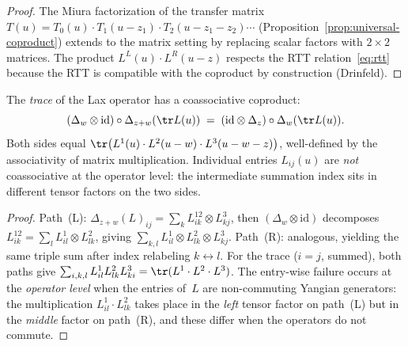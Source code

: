 \begin{proof}
The Miura factorization of the transfer matrix
$T(u) = T_0(u) \cdot T_1(u - z_1) \cdot T_2(u - z_1 - z_2) \cdots$
(Proposition~\ref{prop:universal-coproduct}) extends to the matrix
setting by replacing scalar factors with $2 \times 2$ matrices.
The product $L^L(u) \cdot L^R(u-z)$ respects the RTT
relation~\eqref{eq:rtt} because the RTT is compatible with the
coproduct by construction (Drinfeld).
\end{proof}

\begin{proposition}
\label{prop:trace-coassociativity}
The \emph{trace} of the Lax operator has a coassociative coproduct:
\begin{equation}\label{eq:trace-coassoc}
 (\Delta_w \otimes \mathrm{id}) \circ \Delta_{z+w}(\tr L(u))
 \;=\;
 (\mathrm{id} \otimes \Delta_z) \circ \Delta_w(\tr L(u)).
\end{equation}
Both sides equal
$\tr\bigl(L^1(u) \cdot L^2(u-w) \cdot L^3(u-w-z)\bigr)$,
well-defined by the associativity of matrix multiplication.
Individual entries $L_{ij}(u)$ are \emph{not} coassociative at the
operator level: the intermediate summation index sits in different
tensor factors on the two sides.
\end{proposition}

\begin{proof}
Path~(L): $\Delta_{z+w}(L)_{ij} = \sum_k L^{12}_{ik} \otimes L^3_{kj}$,
then $(\Delta_w \otimes \mathrm{id})$ decomposes
$L^{12}_{ik} = \sum_l L^1_{il} \otimes L^2_{lk}$, giving
$\sum_{k,l} L^1_{il} \otimes L^2_{lk} \otimes L^3_{kj}$.
Path~(R): analogous, yielding the same triple sum after index
relabeling $k \leftrightarrow l$.
For the trace ($i = j$, summed), both paths give
$\sum_{i,k,l} L^1_{il} L^2_{lk} L^3_{ki}
= \tr(L^1 \cdot L^2 \cdot L^3)$.
The entry-wise failure occurs at the \emph{operator level} when
the entries of~$L$ are non-commuting Yangian generators:
the multiplication $L^1_{il} \cdot L^2_{lk}$ takes place in the
\emph{left} tensor factor on path~(L) but in the \emph{middle}
factor on path~(R), and these differ when the operators do not commute.
\end{proof}


